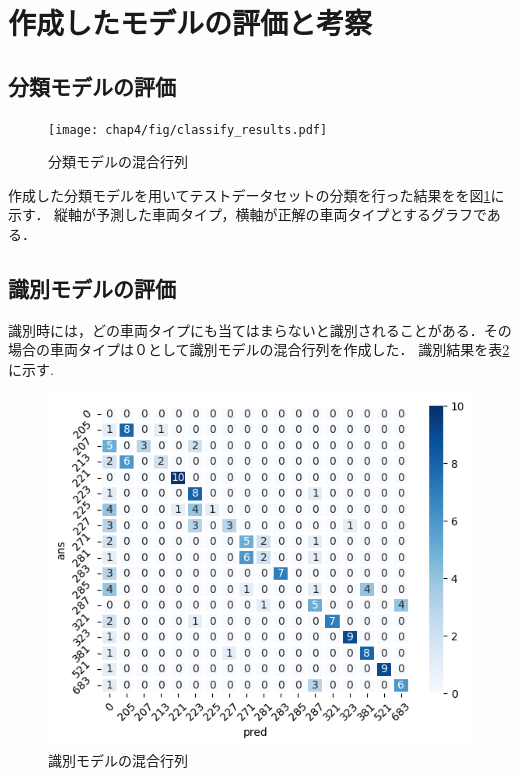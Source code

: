 \section{作成したモデルの評価と考察}

\subsection{分類モデルの評価}
\begin{figure}	
	\centering
	\texttt{[image: chap4/fig/classify\_results.pdf]}
	\caption{分類モデルの混合行列}
	\label{CLS}
\end{figure}
作成した分類モデルを用いてテストデータセットの分類を行った結果をを図\ref{CLS}に示す．
縦軸が予測した車両タイプ，横軸が正解の車両タイプとするグラフである．


\subsection{識別モデルの評価}
識別時には，どの車両タイプにも当てはまらないと識別されることがある．その場合の車両タイプは０として識別モデルの混合行列を作成した．
識別結果を表\ref{fig:chartdet} に示す.\\
\begin{figure}[H]
	\centering
	\includegraphics[width=\linewidth]{chap4/fig/predicted_results.jpg}
	\caption{識別モデルの混合行列}
	\label{fig:chartdet}
\end{figure}



